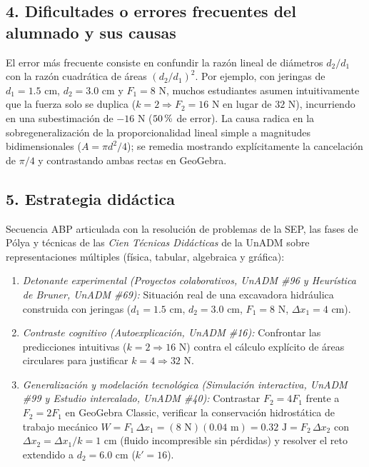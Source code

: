 \documentclass[spanish,letterpaper,oneside]{article}
\begin{document}
\begin{propuestabox}[title={Propuesta Didáctica Escrita · Generalizar en Sistemas Hidráulicos}]
\subsection*{4. Dificultades o errores frecuentes del alumnado y sus causas}
El error más frecuente consiste en confundir la razón lineal de diámetros $d_2/d_1$ con la razón cuadrática de áreas $(d_2/d_1)^2$. Por ejemplo, con jeringas de $d_1 = 1.5\text{ cm}$, $d_2 = 3.0\text{ cm}$ y $F_1 = 8\text{ N}$, muchos estudiantes asumen intuitivamente que la fuerza solo se duplica ($k = 2 \Rightarrow F_2 = 16\text{ N}$ en lugar de $32\text{ N}$), incurriendo en una subestimación de $-16\text{ N}$ ($50\,\text{\symbol{37}}$ de error). La causa radica en la sobregeneralización de la proporcionalidad lineal simple a magnitudes bidimensionales ($A = \pi d^2/4$); se remedia mostrando explícitamente la cancelación de $\pi/4$ y contrastando ambas rectas en GeoGebra.

\subsection*{5. Estrategia didáctica}
Secuencia ABP articulada con la resolución de problemas de la SEP, las fases de Pólya y técnicas de las \textit{Cien Técnicas Didácticas} de la UnADM sobre representaciones múltiples (física, tabular, algebraica y gráfica):
\begin{enumerate}
  \item \textit{Detonante experimental (Proyectos colaborativos, UnADM \#96 y Heurística de Bruner, UnADM \#69):} Situación real de una excavadora hidráulica construida con jeringas ($d_1 = 1.5\text{ cm}$, $d_2 = 3.0\text{ cm}$, $F_1 = 8\text{ N}$, $\Delta x_1 = 4\text{ cm}$).
  \item \textit{Contraste cognitivo (Autoexplicación, UnADM \#16):} Confrontar las predicciones intuitivas ($k = 2 \Rightarrow 16\text{ N}$) contra el cálculo explícito de áreas circulares para justificar $k = 4 \Rightarrow 32\text{ N}$.
  \item \textit{Generalización y modelación tecnológica (Simulación interactiva, UnADM \#99 y Estudio intercalado, UnADM \#40):} Contrastar $F_2 = 4 F_1$ frente a $F_2 = 2 F_1$ en GeoGebra Classic, verificar la conservación hidrostática de trabajo mecánico $W = F_1\,\Delta x_1 = (8\text{ N})(0.04\text{ m}) = 0.32\text{ J} = F_2\,\Delta x_2$ con $\Delta x_2 = \Delta x_1/k = 1\text{ cm}$ (fluido incompresible sin pérdidas) y resolver el reto extendido a $d_2 = 6.0\text{ cm}$ ($k' = 16$).
\end{enumerate}
\end{propuestabox}
\end{document}
